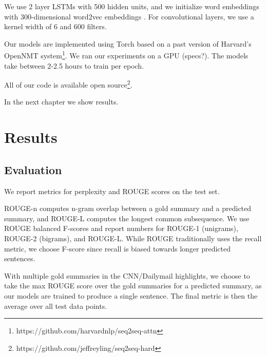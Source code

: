 \documentclass[12pt]{report}
\begin{document}
We use 2 layer LSTMs with 500 hidden units, and we initialize word embeddings with 300-dimensional word2vec embeddings \citep{mikolov2013word2vec}. For convolutional layers, we use a kernel width of 6 and 600 filters.





Our models are implemented using Torch \citep{Torch} based on a past version of Harvard's OpenNMT system\footnote{https://github.com/harvardnlp/seq2seq-attn}. We ran our experiments on a GPU (specs?). 
The models take between 2-2.5 hours to train per epoch.

All of our code is available open source\footnote{https://github.com/jeffreyling/seq2seq-hard}.

In the next chapter we show results.

\chapter{Results}
\label{chap:results}

\section{Evaluation}

We report metrics for perplexity and ROUGE scores \citep{lin2004rouge} on the test set.

ROUGE-n computes n-gram overlap between a gold summary and a predicted summary, and ROUGE-L computes the longest common subsequence.
We use ROUGE balanced F-scores and report numbers for ROUGE-1 (unigrams), ROUGE-2 (bigrams), and ROUGE-L. While ROUGE traditionally uses the recall metric, we choose F-score since recall is biased towards longer predicted sentences.

With multiple gold summaries in the CNN/Dailymail highlights, we choose to take the max ROUGE score over the gold summaries for a predicted summary, as our models are trained to produce a single sentence. The final metric is then the average over all test data points. %
\end{document}
